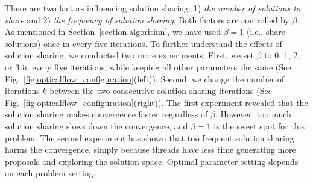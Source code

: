 There are two factors influencing solution sharing: 1) \textit{the
number of solutions to share} and 2) \textit{the frequency of solution
sharing}. Both factors are controlled by $\beta$. As mentioned in
Section~\ref{section:algorithm}, we have used $\beta = 1$ (i.e., share
solutions) once in every five iterations.  To further understand the
effects of solution sharing, we conducted two more experiments. First,
we set $\beta$ to 0, 1, 2, or 3 in every five iterations,
while keeping all other parameters the same (See
Fig.~\ref{fig:opticalflow_configuration}(left)).  Second, we change the number of
iterations $k$ between the two consecutive solution sharing iterations
(See Fig.~\ref{fig:opticalflow_configuration}(right)).  The first experiment
revealed that the solution sharing makes convergence faster regardless of
$\beta$.  However, too much solution sharing slows down the convergence,
and $\beta=1$ is the sweet spot for this problem.
%
%
The second experiment has shown that too frequent solution sharing
harms the convergence, simply because threads have less time generating more
proposals and exploring the solution space.
Optimal parameter setting depends on each problem setting.


